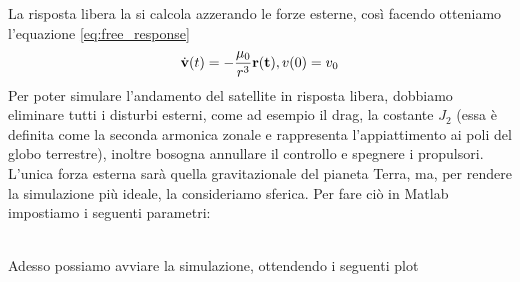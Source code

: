 La risposta libera la si calcola azzerando le forze esterne, così facendo
otteniamo l'equazione \ref{eq:free_response}
\begin{equation}
\dot{\bf v}(t)=-\frac{\mu_0}{r^3}{\bf r(t)}, v(0)=v_0 \nonumber
\end{equation}
Per poter simulare l'andamento del satellite in risposta libera, dobbiamo
eliminare tutti i disturbi esterni, come ad esempio il drag, la costante $J_2$
(essa è definita come la seconda armonica zonale e rappresenta l'appiattimento
ai poli del globo terrestre), inoltre bosogna annullare il controllo e spegnere
i propulsori. L'unica forza esterna sarà quella gravitazionale del pianeta
Terra, ma, per rendere la simulazione più ideale, la consideriamo sferica. Per
fare ciò in Matlab impostiamo i seguenti parametri:

\\
Adesso possiamo avviare la simulazione, ottendendo i seguenti plot


